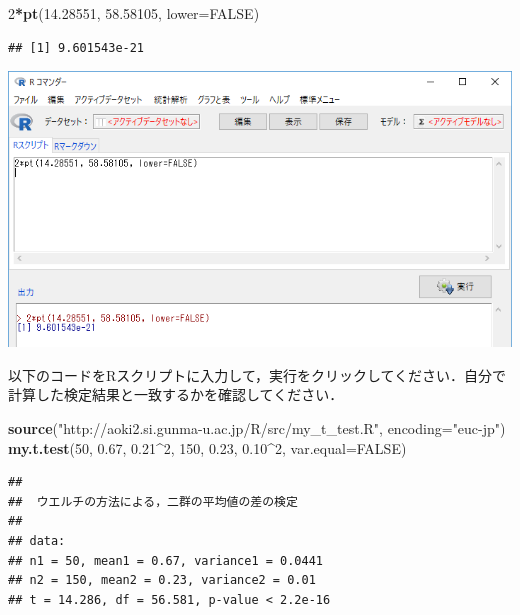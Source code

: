 \documentclass[]{problemset}
\newenvironment{Shaded}{\begin{snugshade}}{\end{snugshade}}
\newcommand{\DataTypeTok}[1]{\textcolor[rgb]{0.13,0.29,0.53}{#1}}
\newcommand{\DecValTok}[1]{\textcolor[rgb]{0.00,0.00,0.81}{#1}}
\newcommand{\FloatTok}[1]{\textcolor[rgb]{0.00,0.00,0.81}{#1}}
\newcommand{\KeywordTok}[1]{\textcolor[rgb]{0.13,0.29,0.53}{\textbf{#1}}}
\newcommand{\NormalTok}[1]{#1}
\newcommand{\OperatorTok}[1]{\textcolor[rgb]{0.81,0.36,0.00}{\textbf{#1}}}
\newcommand{\OtherTok}[1]{\textcolor[rgb]{0.56,0.35,0.01}{#1}}
\newcommand{\StringTok}[1]{\textcolor[rgb]{0.31,0.60,0.02}{#1}}
\begin{document}
\begin{Shaded}
\begin{Highlighting}[]
\DecValTok{2}\OperatorTok{*}\KeywordTok{pt}\NormalTok{(}\FloatTok{14.28551}\NormalTok{, }\FloatTok{58.58105}\NormalTok{, }\DataTypeTok{lower=}\OtherTok{FALSE}\NormalTok{)}
\end{Highlighting}
\end{Shaded}

\begin{verbatim}
## [1] 9.601543e-21
\end{verbatim}

\begin{center}\includegraphics[width=0.9\linewidth]{pic/tvaluepvalue01} \end{center}
\bigskip

以下のコードをRスクリプトに入力して，実行をクリックしてください．自分で計算した検定結果と一致するかを確認してください．

\begin{Shaded}
\begin{Highlighting}[]
\KeywordTok{source}\NormalTok{(}\StringTok{"http://aoki2.si.gunma-u.ac.jp/R/src/my_t_test.R"}\NormalTok{, }\DataTypeTok{encoding=}\StringTok{"euc-jp"}\NormalTok{)}
\KeywordTok{my.t.test}\NormalTok{(}\DecValTok{50}\NormalTok{, }\FloatTok{0.67}\NormalTok{, }\FloatTok{0.21}\OperatorTok{^}\DecValTok{2}\NormalTok{, }\DecValTok{150}\NormalTok{, }\FloatTok{0.23}\NormalTok{, }\FloatTok{0.10}\OperatorTok{^}\DecValTok{2}\NormalTok{, }\DataTypeTok{var.equal=}\OtherTok{FALSE}\NormalTok{)}
\end{Highlighting}
\end{Shaded}

\begin{verbatim}
## 
##  ウエルチの方法による，二群の平均値の差の検定
## 
## data:  
## n1 = 50, mean1 = 0.67, variance1 = 0.0441
## n2 = 150, mean2 = 0.23, variance2 = 0.01
## t = 14.286, df = 56.581, p-value < 2.2e-16
\end{verbatim}
\end{document}
